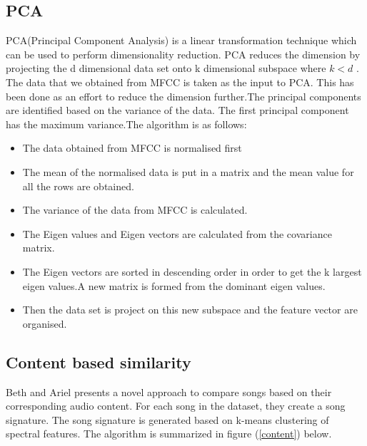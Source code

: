 \documentclass[12pt]{article}
\begin{document}
\subsection{PCA}
PCA(Principal Component Analysis) is a linear transformation technique which can be used to perform dimensionality reduction. PCA reduces the dimension by projecting the d dimensional data set onto k dimensional subspace where $k<d$ \cite{holand}. The data that we obtained from MFCC is taken as the input to  PCA. This has been done as an effort to reduce the dimension further.The principal components are identified based on the variance of the data. The first principal component has the maximum variance.The algorithm is as follows:
\begin{itemize}
  \item The data obtained from MFCC is normalised first
  \item The mean of the normalised data is put in a matrix and the mean value for all the rows are obtained.
  \item The variance of the data from MFCC is calculated.
  \item The Eigen values and Eigen vectors are calculated from the covariance matrix.
  \item The Eigen vectors are sorted in descending order in order to get the k largest eigen values.A new matrix is formed from the dominant eigen values.
  \item Then the data set is project on this new subspace and the feature vector are organised.
\end{itemize}
\subsection{Content based similarity}
Beth and Ariel \cite{logan} presents a novel approach to compare songs based on their corresponding audio content. For each song in the dataset, they create a song signature. The song signature is generated based on k-means clustering of spectral features. The algorithm is summarized in figure (\ref{content}) below.
\end{document}
